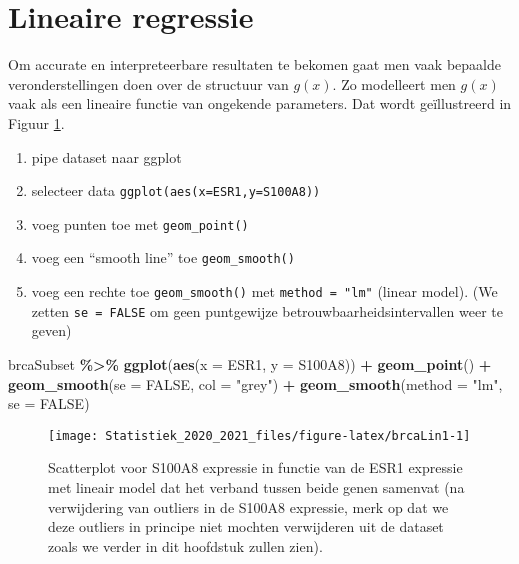 \documentclass[
  12pt,dutch,coursenotes]{book}
\newenvironment{Shaded}{\begin{snugshade}}{\end{snugshade}}
\newcommand{\DataTypeTok}[1]{\textcolor[rgb]{0.13,0.29,0.53}{#1}}
\newcommand{\KeywordTok}[1]{\textcolor[rgb]{0.13,0.29,0.53}{\textbf{#1}}}
\newcommand{\NormalTok}[1]{#1}
\newcommand{\OperatorTok}[1]{\textcolor[rgb]{0.81,0.36,0.00}{\textbf{#1}}}
\newcommand{\OtherTok}[1]{\textcolor[rgb]{0.56,0.35,0.01}{#1}}
\newcommand{\StringTok}[1]{\textcolor[rgb]{0.31,0.60,0.02}{#1}}
\providecommand{\tightlist}{%
  \setlength{\itemsep}{0pt}\setlength{\parskip}{0pt}}
\theoremstyle{definition}
\theoremstyle{definition}
\theoremstyle{definition}
\theoremstyle{remark}
\begin{document}
\hypertarget{lineaire-regressie}{%
\section{Lineaire regressie}\label{lineaire-regressie}}

Om accurate en interpreteerbare resultaten te bekomen gaat men vaak bepaalde veronderstellingen doen over de structuur van \(g(x)\).
Zo modelleert men \(g(x)\) vaak als een lineaire functie van ongekende parameters.
Dat wordt geïllustreerd in Figuur \ref{fig:brcaLin1}.

\begin{enumerate}
\def\labelenumi{\arabic{enumi}.}
\tightlist
\item
  pipe dataset naar ggplot
\item
  selecteer data \texttt{ggplot(aes(x=ESR1,y=S100A8))}
\item
  voeg punten toe met \texttt{geom\_point()}
\item
  voeg een ``smooth line'' toe \texttt{geom\_smooth()}
\item
  voeg een rechte toe \texttt{geom\_smooth()} met \texttt{method\ =\ "lm"} (linear model). (We zetten \texttt{se\ =\ FALSE} om geen puntgewijze betrouwbaarheidsintervallen weer te geven)
\end{enumerate}

\begin{Shaded}
\begin{Highlighting}[]
\NormalTok{brcaSubset }\OperatorTok{\%\textgreater{}\%}\StringTok{ }\KeywordTok{ggplot}\NormalTok{(}\KeywordTok{aes}\NormalTok{(}\DataTypeTok{x =}\NormalTok{ ESR1, }\DataTypeTok{y =}\NormalTok{ S100A8)) }\OperatorTok{+}\StringTok{ }
\StringTok{    }\KeywordTok{geom\_point}\NormalTok{() }\OperatorTok{+}\StringTok{ }\KeywordTok{geom\_smooth}\NormalTok{(}\DataTypeTok{se =} \OtherTok{FALSE}\NormalTok{, }\DataTypeTok{col =} \StringTok{"grey"}\NormalTok{) }\OperatorTok{+}\StringTok{ }
\StringTok{    }\KeywordTok{geom\_smooth}\NormalTok{(}\DataTypeTok{method =} \StringTok{"lm"}\NormalTok{, }\DataTypeTok{se =} \OtherTok{FALSE}\NormalTok{)}
\end{Highlighting}
\end{Shaded}

\begin{figure}

{\centering \texttt{[image: Statistiek\_2020\_2021\_files/figure-latex/brcaLin1-1]} 

}

\caption{Scatterplot voor S100A8 expressie in functie van de ESR1 expressie met lineair model dat het verband tussen beide genen samenvat (na verwijdering van outliers in de S100A8 expressie, merk op dat we deze outliers in principe niet mochten verwijderen uit de dataset zoals we verder in dit hoofdstuk zullen zien).}\label{fig:brcaLin1}
\end{figure}
\end{document}
